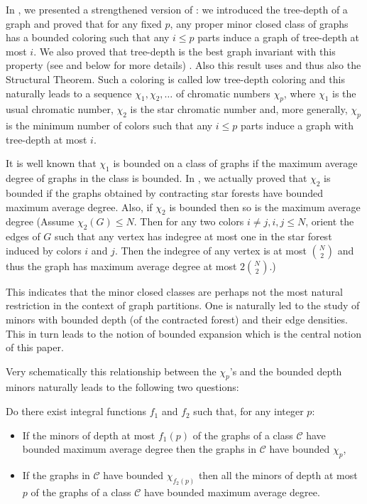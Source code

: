 \documentclass[a4paper]{amsart}
\theoremstyle{definition}
\theoremstyle{remark}
\begin{document}
In \cite{Taxi_tdepth}, we presented a strengthened version of
\cite{2tw} : 
we introduced the
 tree-depth
of a graph and proved that
for any fixed $p$, any proper
minor closed class of graphs has a bounded coloring such that any
$i\leq p$ parts induce a graph of tree-depth at most $i$. We also proved
that tree-depth is the best graph invariant with this property 
(see \cite{Taxi_tdepth} and below for more details) .
Also this result uses \cite{2tw} and thus also the 
Structural Theorem. Such a coloring is called low tree-depth coloring
and 
this naturally leads  to  a sequence $\chi_1, \chi_2, \ldots$
of chromatic numbers $\chi_p$,
where $\chi_1$ is the usual chromatic number, $\chi_2$ is the star
chromatic number and, more generally, $\chi_p$ is the minimum number
of colors such that any $i\leq p$ parts induce a graph with tree-depth
at most $i$.

It is well known that $\chi_1$ is bounded on a class of graphs if
the maximum average degree of graphs in the class is
bounded. In \cite{Taxi_jcolor}, we actually proved that $\chi_2$ is bounded if
the graphs obtained by contracting star forests have bounded maximum
average degree. Also, if $\chi_2$ is bounded then so is the maximum
average degree
 (Assume $\chi_2(G) \leq N$. Then for any two colors 
$i\neq j, i, j \leq N$,
orient the edges of $G$  such that any vertex has 
indegree at most one
in the star forest induced by colors $i$ and $j$. Then the indegree of
any vertex 
is at most $\binom{N}{2}$ and thus the graph has maximum average
degree at most $2\binom{N}{2}$.)

This indicates that  the minor closed classes are perhaps  not the most natural 
restriction in the context of graph partitions. One is naturally led to the 
study of minors with bounded depth (of the contracted forest) and their 
edge densities. This in turn leads to the notion of bounded expansion 
which is the central notion of this paper. 

Very schematically
this relationship between the $\chi_p$'s and the bounded depth minors
naturally leads to the following two  questions:

Do there exist integral functions $f_1$ and $f_2$ such that, for any integer $p$:

\begin{itemize}
\item If the minors of depth at most $f_1(p)$ of the graphs of a class
$\mathcal C$ have
bounded maximum average degree then the graphs in $\mathcal C$ have
bounded $\chi_p$,
\item If the graphs in $\mathcal C$ have bounded $\chi_{f_2(p)}$ then all  the
minors of depth at most $p$ of the graphs of a class
$\mathcal C$ have
bounded maximum average degree.
\end{itemize}
\end{document}
